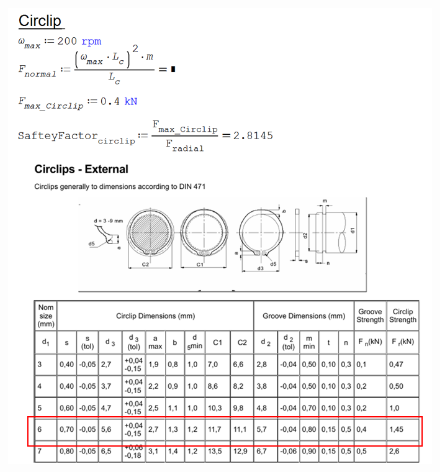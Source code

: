 \begin{figure}[H]
    \centering
    \includegraphics[width =\textwidth]{figs/Design/Rotor/Calcs_Circlip.png}
\end{figure}
\begin{landscape}

\end{landscape}
